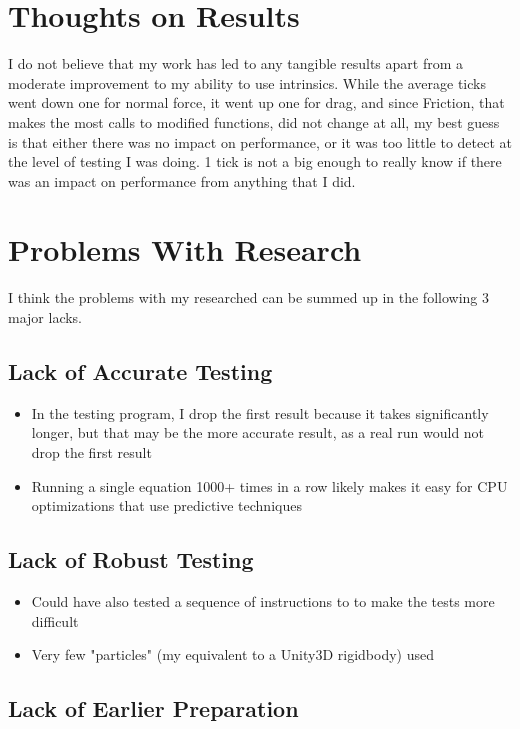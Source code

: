 \documentclass{article}
\begin{document}
\section{Thoughts on Results}

I do not believe that my work has led to any tangible results apart from a moderate improvement to my ability to use intrinsics. While the average ticks went down one for normal force, it went up one for drag, and since Friction, that makes the most calls to modified functions, did not change at all, my best guess is that either there was no impact on performance, or it was too little to detect at the level of testing I was doing. 1 tick is not a big enough to really know if there was an impact on performance from anything that I did.

\section{Problems With Research}

I think the problems with my researched can be summed up in the following 3 major lacks.

\subsection{Lack of Accurate Testing}

\begin{itemize}
\item In the testing program, I drop the first result because it takes significantly longer, but that may be the more accurate result, as a real run would not drop the first result
\item Running a single equation 1000+ times in a row likely makes it easy for CPU optimizations that use predictive techniques
\end{itemize}

\subsection{Lack of Robust Testing}

\begin{itemize}
\item Could have also tested a sequence of instructions to to make the tests more difficult
\item Very few "particles" (my equivalent to a Unity3D rigidbody) used
\end{itemize}

\subsection{Lack of Earlier Preparation}
\end{document}

